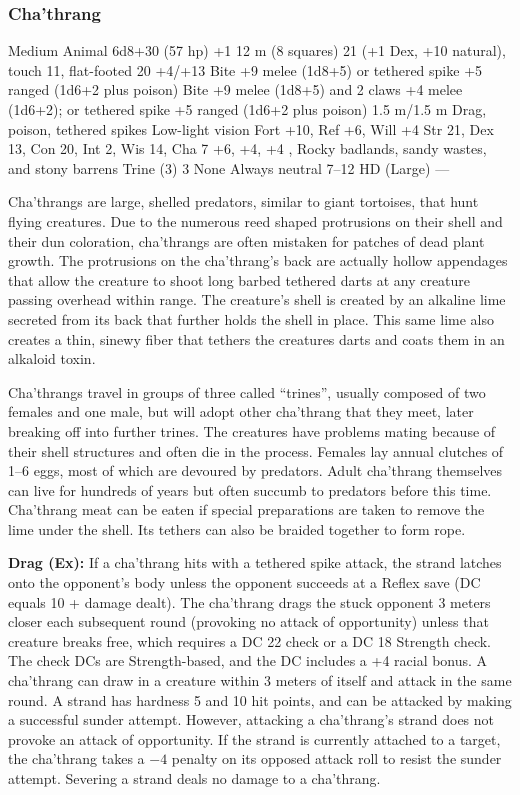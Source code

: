 \subsubsection{Cha'thrang}
\begin{MonsterStats}
{Medium Animal}
{6d8+30 (57 hp)}
{+1}
{12 m (8 squares)}
{21 (+1 Dex, +10 natural), touch 11, flat-footed 20}
{+4/+13}
{Bite +9 melee (1d8+5) or tethered spike +5 ranged (1d6+2 plus poison)}
{Bite +9 melee (1d8+5) and 2 claws +4 melee (1d6+2); or tethered spike +5 ranged (1d6+2 plus poison)}
{1.5 m/1.5 m}
{Drag, poison, tethered spikes}
{Low-light vision}
{Fort +10, Ref +6, Will +4}
{Str 21, Dex 13, Con 20, Int 2, Wis 14, Cha 7}
{ +6,  +4,  +4}
{, }
{Rocky badlands, sandy wastes, and stony barrens}
{Trine (3)}
{3}
{None}
{Always neutral}
{7--12 HD (Large)}
{---}
\end{MonsterStats}

Cha'thrangs are large, shelled predators, similar to giant tortoises, that hunt flying creatures. Due to the numerous reed shaped protrusions on their shell and their dun coloration, cha'thrangs are often mistaken for patches of dead plant growth. The protrusions on the cha'thrang's back are actually hollow appendages that allow the creature to shoot long barbed tethered darts at any creature passing overhead within range. The creature's shell is created by an alkaline lime secreted from its back that further holds the shell in place. This same lime also creates a thin, sinewy fiber that tethers the creatures
darts and coats them in an alkaloid toxin.

Cha'thrangs travel in groups of three called ``trines'', usually composed of two females and one male, but will adopt other cha'thrang that they meet, later breaking off into further trines. The creatures have problems mating because of their shell structures and often die in the process. Females lay annual clutches of 1--6 eggs, most of which are devoured by predators. Adult cha'thrang themselves can live for hundreds of years but often succumb to predators before this time. Cha'thrang meat can be eaten if special preparations are taken to remove the lime under the shell. Its tethers can also be braided together to form rope.

\textbf{Drag (Ex):} If a cha'thrang hits with a tethered spike attack, the strand latches onto the opponent's body unless the opponent succeeds at a Reflex save (DC equals 10 + damage dealt). The cha'thrang drags the stuck opponent 3 meters closer each subsequent round (provoking no attack of opportunity) unless that creature breaks free, which requires a DC 22  check or a DC 18 Strength check. The check DCs are Strength-based, and the  DC includes a +4 racial bonus. A cha'thrang can draw in a creature within 3 meters of itself and attack in the same round. A strand has hardness 5 and 10 hit points, and can be attacked by making a successful sunder attempt. However, attacking a cha'thrang's strand does not provoke an attack of opportunity. If the strand is currently attached to a target, the cha'thrang takes a $-4$ penalty on its opposed attack roll to resist the sunder attempt. Severing a strand deals no damage to a cha'thrang.


